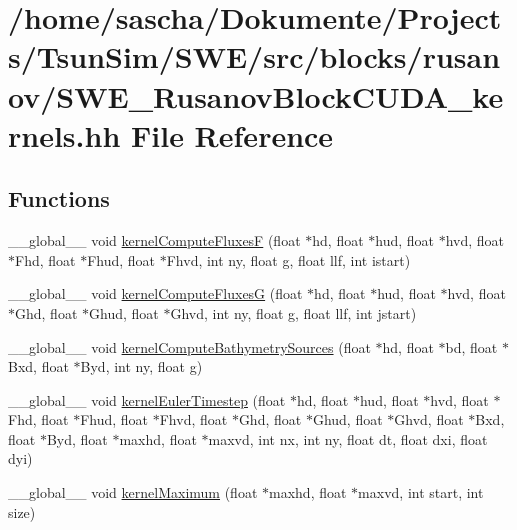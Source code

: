 \hypertarget{SWE__RusanovBlockCUDA__kernels_8hh}{\section{/home/sascha/\-Dokumente/\-Projects/\-Tsun\-Sim/\-S\-W\-E/src/blocks/rusanov/\-S\-W\-E\-\_\-\-Rusanov\-Block\-C\-U\-D\-A\-\_\-kernels.hh File Reference}
\label{SWE__RusanovBlockCUDA__kernels_8hh}
}
\subsection*{Functions}
\begin{DoxyCompactItemize}
\item 
\-\_\-\-\_\-global\-\_\-\-\_\- void \hyperlink{SWE__RusanovBlockCUDA__kernels_8hh_a125f373796424316bc49a0eb60f5f90e}{kernel\-Compute\-Fluxes\-F} (float $\ast$hd, float $\ast$hud, float $\ast$hvd, float $\ast$Fhd, float $\ast$Fhud, float $\ast$Fhvd, int ny, float g, float llf, int istart)
\item 
\-\_\-\-\_\-global\-\_\-\-\_\- void \hyperlink{SWE__RusanovBlockCUDA__kernels_8hh_a4a5d67e82c837347e337904d4c17cc07}{kernel\-Compute\-Fluxes\-G} (float $\ast$hd, float $\ast$hud, float $\ast$hvd, float $\ast$Ghd, float $\ast$Ghud, float $\ast$Ghvd, int ny, float g, float llf, int jstart)
\item 
\-\_\-\-\_\-global\-\_\-\-\_\- void \hyperlink{SWE__RusanovBlockCUDA__kernels_8hh_aa7530530448af30119436099351cfead}{kernel\-Compute\-Bathymetry\-Sources} (float $\ast$hd, float $\ast$bd, float $\ast$Bxd, float $\ast$Byd, int ny, float g)
\item 
\-\_\-\-\_\-global\-\_\-\-\_\- void \hyperlink{SWE__RusanovBlockCUDA__kernels_8hh_a105ff13519fe40ec2acbc182d5584a07}{kernel\-Euler\-Timestep} (float $\ast$hd, float $\ast$hud, float $\ast$hvd, float $\ast$Fhd, float $\ast$Fhud, float $\ast$Fhvd, float $\ast$Ghd, float $\ast$Ghud, float $\ast$Ghvd, float $\ast$Bxd, float $\ast$Byd, float $\ast$maxhd, float $\ast$maxvd, int nx, int ny, float dt, float dxi, float dyi)
\item 
\-\_\-\-\_\-global\-\_\-\-\_\- void \hyperlink{SWE__RusanovBlockCUDA__kernels_8hh_ae810017f0a27a38e1c5d78c7130e8ab4}{kernel\-Maximum} (float $\ast$maxhd, float $\ast$maxvd, int start, int size)
\end{DoxyCompactItemize}


